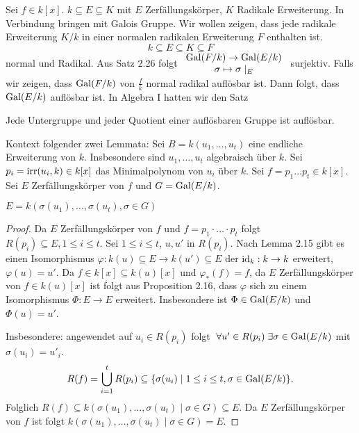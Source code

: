 Sei $f \in k[x]$. $k \subseteq E \subseteq K$ mit $E$ Zerfällungskörper, $K$ Radikale Erweiterung. 
In Verbindung bringen mit Galois Gruppe.
Wir wollen zeigen, dass jede radikale Erweiterung $K / k$ in einer normalen radikalen Erweiterung $F$ enthalten ist.
\[
k \subseteq E \subseteq K \subseteq F
\] 
normal und Radikal. Aus Satz 2.26 folgt $\begin{array}{c} \operatorname{Gal}(F / k) \to \operatorname{Gal}( E / k)\\ \sigma \mapsto \sigma \mid_{E}\\ \end{array}$ surjektiv.
Falls wir zeigen, dass $\operatorname{Gal}(F / k)$ von $\frac{f}{k}$ normal radikal auflösbar ist.
Dann folgt, dass $\operatorname{Gal}(E / k)$ auflösbar ist.
In Algebra I hatten wir den Satz
\begin{theorem}
	Jede Untergruppe und jeder Quotient einer auflösbaren Gruppe ist auflösbar.
\end{theorem}

Kontext folgender zwei Lemmata: Sei $B = k(u_1,\ldots,u_{t})$ eine endliche Erweiterung von $k$.
Insbesondere sind $u_1,\ldots,u_{t}$ algebraisch über $k$.
Sei $p_{i} = \operatorname{irr}(u_{i},k) \in k[x]$ das Minimalpolynom von $u_{i}$ über $k$.
Sei $f = p_1 \ldots p_{t} \in k[x]$. Sei $E$ Zerfällungskörper von $f$ und $G = \operatorname{Gal}(E / k)$.

\begin{lemma}
	$E = k(\sigma(u_1),\ldots,\sigma(u_{t}), \sigma \in G)$
\end{lemma}

\begin{proof}
	Da $E$ Zerfällungskörper von $f$ und $f = p_1 \cdot \ldots\cdot p_{t}$ folgt $R(p_{i}) \subseteq E, 1 \leq i \leq t$.
	Sei $1 \leq i \leq t$, $u, u'$ in $R(p_{i})$. Nach Lemma 2.15 gibt es einen Isomorphismus $\varphi: k(u) \subseteq E \to k(u') \subseteq E$ 
	der $\operatorname{id}_{k}: k \to k$ erweitert, $\varphi(u) = u'$.
	Da $f \in k[x] \subseteq k(u)[x]$ und $\varphi_{*}(f) = f$, da $E$ Zerfällungskörper von $f \in k(u)[x]$ ist
	folgt aus Proposition 2.16, dass $\varphi$ sich zu einem Isomorphismus $\Phi: E \to E$ erweitert.
	Insbesondere ist $\Phi \in \operatorname{Gal}(E / k)$ und $\Phi(u) = u'$.

	Insbesondere: angewendet auf $u_{i} \in R(p_{i})$ folgt $\forall u' \in R(p_{i}) \exists \sigma \in \gal(E / k)$ mit $\sigma(u_{i}) = u'_{i}$.
	\[
		R(f) = \bigcup_{i=1}^{t} R(p_{i}) \subseteq \{\sigma(u_{i}) \mid 1\leq i \leq t, \sigma \in \operatorname{Gal}(E / k)\} 
	.\] 
	Folglich $R(f) \subseteq k(\sigma(u_1),\ldots,\sigma(u_{t}) \mid \sigma \in G) \subseteq E$.
	Da $E$ Zerfällungskörper von $f$ ist folgt $k(\sigma(u_1),\ldots,\sigma(u_{t}) \mid \sigma \in G) = E$.
\end{proof}




























